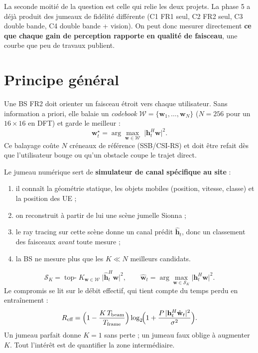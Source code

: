 \documentclass[11pt,a4paper]{article}
\begin{document}
La seconde moitié de la question est celle qui relie les deux projets. La phase 5 a déjà produit
des jumeaux de fidélité différente (C1 FR1 seul, C2 FR2 seul, C3 double bande, C4 double bande +
vision). On peut donc mesurer directement \textbf{ce que chaque gain de perception rapporte en
qualité de faisceau}, une courbe que peu de travaux publient.

\section{Principe général}

Une BS FR2 doit orienter un faisceau étroit vers chaque utilisateur. Sans information a priori,
elle balaie un \textit{codebook} $\mathcal{W}=\{\mathbf{w}_1,\dots,\mathbf{w}_N\}$ ($N=256$ pour
un $16\times16$ en DFT) et garde le meilleur :
\begin{equation}
  \mathbf{w}^\star_t = \arg\max_{\mathbf{w}\in\mathcal{W}} \;\bigl|\mathbf{h}_t^{H}\mathbf{w}\bigr|^2 .
\end{equation}
Ce balayage coûte $N$ créneaux de référence (SSB/CSI-RS) et doit être refait dès que
l'utilisateur bouge ou qu'un obstacle coupe le trajet direct.

Le jumeau numérique sert de \textbf{simulateur de canal spécifique au site} :
\begin{enumerate}
  \item il connaît la géométrie statique, les objets mobiles (position, vitesse, classe) et la
        position des UE ;
  \item on reconstruit à partir de lui une \og scène jumelle \fg{} Sionna ;
  \item le ray tracing sur cette scène donne un canal prédit $\hat{\mathbf{h}}_t$, donc un
        classement des faisceaux \emph{avant} toute mesure ;
  \item la BS ne mesure plus que les $K \ll N$ meilleurs candidats.
\end{enumerate}
\begin{equation}
  \mathcal{S}_K = \operatorname{top-}K_{\mathbf{w}\in\mathcal{W}}\;
      \bigl|\hat{\mathbf{h}}_t^{H}\mathbf{w}\bigr|^2,
  \qquad
  \hat{\mathbf{w}}_t = \arg\max_{\mathbf{w}\in\mathcal{S}_K} \bigl|\mathbf{h}_t^{H}\mathbf{w}\bigr|^2 .
\end{equation}
Le compromis se lit sur le débit effectif, qui tient compte du temps perdu en entraînement :
\begin{equation}
  R_{\text{eff}} = \Bigl(1-\frac{K\,T_{\text{beam}}}{T_{\text{frame}}}\Bigr)
                   \log_2\!\Bigl(1+\frac{P\,|\mathbf{h}_t^{H}\hat{\mathbf{w}}_t|^2}{\sigma^2}\Bigr).
\end{equation}
Un jumeau parfait donne $K=1$ sans perte ; un jumeau faux oblige à augmenter $K$. Tout l'intérêt
est de quantifier la zone intermédiaire.
\end{document}
